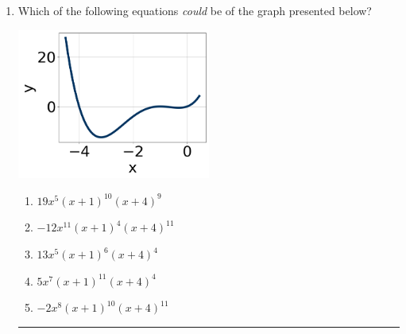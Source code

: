 \documentclass[14pt]{extbook}
\newcommand{\litem}[1]{\item#1\hspace*{-1cm}\rule{\textwidth}{0.4pt}}
\begin{document}
\begin{enumerate}
\litem{
Which of the following equations \textit{could} be of the graph presented below?
\begin{center}
    \includegraphics[width=0.5\textwidth]{../Figures/polyGraphToFunctionCopyB.png}
\end{center}
\begin{enumerate}[label=\Alph*.]
\item \( 19x^{5} (x + 1)^{10} (x + 4)^{9} \)
\item \( -12x^{11} (x + 1)^{4} (x + 4)^{11} \)
\item \( 13x^{5} (x + 1)^{6} (x + 4)^{4} \)
\item \( 5x^{7} (x + 1)^{11} (x + 4)^{4} \)
\item \( -2x^{8} (x + 1)^{10} (x + 4)^{11} \)


\end{enumerate}}
\end{enumerate}
\end{document}
